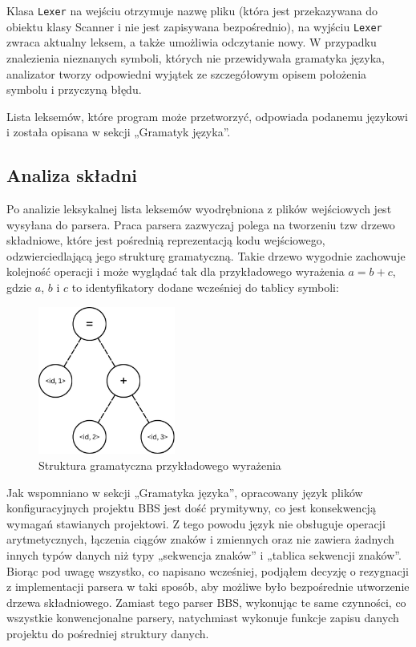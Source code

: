 Klasa \texttt{Lexer} na wejściu otrzymuje nazwę pliku (która jest przekazywana do obiektu klasy Scanner i nie jest zapisywana bezpośrednio), na wyjściu \texttt{Lexer} zwraca aktualny leksem, a także umożliwia odczytanie nowy. W przypadku znalezienia nieznanych symboli, których nie przewidywała gramatyka języka, analizator tworzy odpowiedni wyjątek ze szczegółowym opisem położenia symbolu i przyczyną błędu.

Lista leksemów, które program może przetworzyć, odpowiada podanemu językowi i została opisana w sekcji „Gramatyk języka”.

\subsection{Analiza składni}

Po analizie leksykalnej lista leksemów wyodrębniona z plików wejściowych jest wysyłana do parsera. Praca parsera zazwyczaj polega na tworzeniu tzw drzewo składniowe, które jest pośrednią reprezentacją kodu wejściowego, odzwierciedlającą jego strukturę gramatyczną. Takie drzewo wygodnie zachowuje kolejność operacji i może wyglądać tak dla przykładowego wyrażenia $a = b + c$, gdzie $a$, $b$ i $c$ to identyfikatory dodane wcześniej do tablicy symboli:

\begin{figure}[h]
    \centering
    \includegraphics[width=0.4\textwidth]{Images/syntax_tree.png}
    \caption{Struktura gramatyczna przykładowego wyrażenia}
\end{figure}

Jak wspomniano w sekcji „Gramatyka języka”, opracowany język plików konfiguracyjnych projektu BBS jest dość prymitywny, co jest konsekwencją wymagań stawianych projektowi. Z tego powodu język nie obsługuje operacji arytmetycznych, łączenia ciągów znaków i zmiennych oraz nie zawiera żadnych innych typów danych niż typy „sekwencja znaków” i „tablica sekwencji znaków”. Biorąc pod uwagę wszystko, co napisano wcześniej, podjąłem decyzję o rezygnacji z implementacji parsera w taki sposób, aby możliwe było bezpośrednie utworzenie drzewa składniowego. Zamiast tego parser BBS, wykonując te same czynności, co wszystkie konwencjonalne parsery, natychmiast wykonuje funkcje zapisu danych projektu do pośredniej struktury danych.


